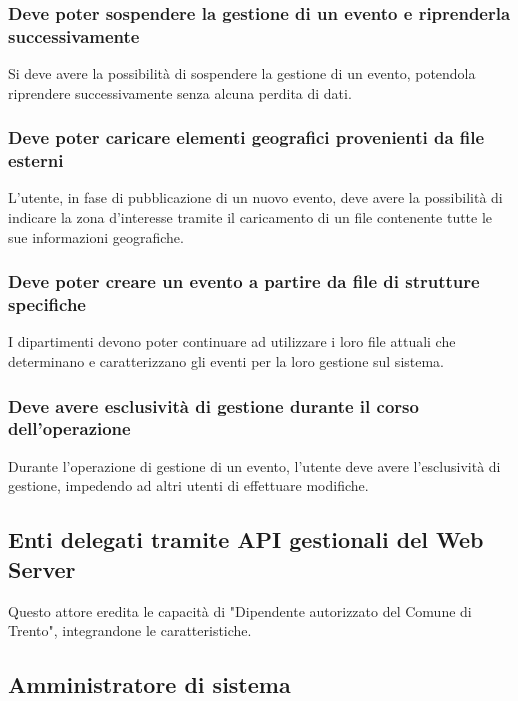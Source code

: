 \documentclass{article}
\begin{document}
\subsubsection{Deve poter sospendere la gestione di un evento e riprenderla successivamente}
Si deve avere la possibilità di sospendere la gestione di un evento, potendola riprendere successivamente senza alcuna perdita di dati.

\subsubsection{Deve poter caricare elementi geografici provenienti da file esterni}
L'utente, in fase di pubblicazione di un nuovo evento, deve avere la possibilità di indicare la zona d'interesse tramite il caricamento di un file contenente tutte le sue informazioni geografiche.

\subsubsection{Deve poter creare un evento a partire da file di strutture specifiche}
I dipartimenti devono poter continuare ad utilizzare i loro file attuali che determinano e caratterizzano gli eventi per la loro gestione sul sistema.

\subsubsection{Deve avere esclusività di gestione durante il corso dell'operazione}
Durante l'operazione di gestione di un evento, l'utente deve avere l'esclusività di gestione, impedendo ad altri utenti di effettuare modifiche.

\subsection{Enti delegati tramite API gestionali del Web Server}
Questo attore eredita le capacità di "Dipendente autorizzato del Comune di Trento", integrandone le caratteristiche.

\subsection{Amministratore di sistema}
\end{document}
